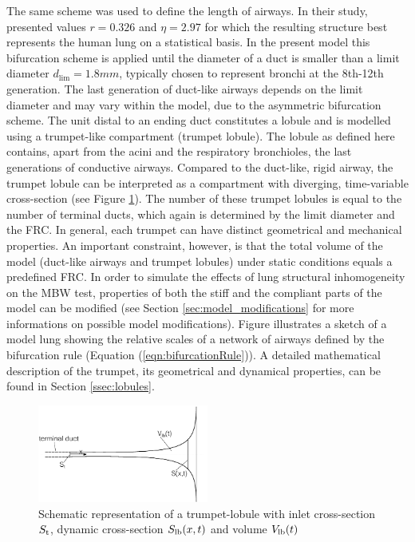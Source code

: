 The same scheme was used to define the length of airways.
In their study, \citet{Majumdar2005} presented values $r = 0.326$ and $\eta = 2.97$ for which the resulting structure best represents the human lung on a statistical basis.
In the present model this bifurcation scheme is applied until the diameter of a duct is smaller than a limit diameter $d_\mathrm{lim} = 1.8 \unit{mm}$, typically chosen to represent bronchi at the 8th-12th generation.
The last generation of duct-like airways depends on the limit diameter and may vary within the model, due to the asymmetric bifurcation scheme.
The unit distal to an ending duct constitutes a lobule and is modelled using a trumpet-like compartment (trumpet lobule).
The lobule as defined here contains, apart from the acini and the respiratory bronchioles, the last generations of conductive airways.
Compared to the duct-like, rigid airway, the trumpet lobule can be interpreted as a compartment with diverging, time-variable cross-section (see Figure \ref{fig:trumpetSketch}).
The number of these trumpet lobules is equal to the number of terminal ducts, which again is determined by the limit diameter and the FRC.
In general, each trumpet can have distinct geometrical and mechanical properties.
An important constraint, however, is that the total volume of the model (duct-like airways and trumpet lobules) under static conditions equals a predefined FRC.
In order to simulate the effects of lung structural inhomogeneity on the MBW test, properties of both the stiff and the compliant parts of the model can be modified (see Section \ref{sec:model_modifications} for more informations on possible model modifications).
Figure illustrates a sketch of a model lung showing the relative scales of a network of airways defined by the bifurcation rule (Equation (\ref{eqn:bifurcationRule})).
A detailed mathematical description of the trumpet, its geometrical and dynamical properties, can be found in Section \ref{ssec:lobules}.

\begin{figure}[tb]
\centering
\includegraphics[width=0.5\textwidth]{figures/trumpetmodel}
\caption{Schematic representation of a trumpet-lobule with inlet cross-section $S_{\mathrm{t}}$, dynamic cross-section $S_{\mathrm{lb}}(x,t)$ and volume $V_{\mathrm{lb}}(t)$}
\label{fig:trumpetSketch}
\end{figure}


